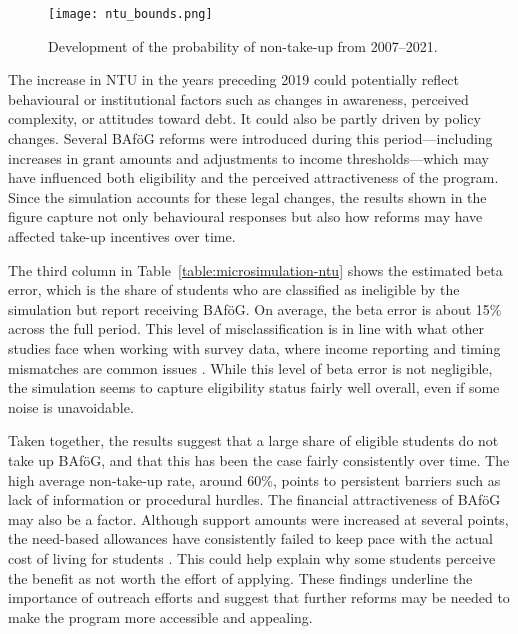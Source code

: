 \begin{figure}[htbp]
  \centering
  \texttt{[image: ntu\_bounds.png]}
  \caption{Development of the probability of non-take-up from 2007--2021.}
  \label{fig:ntu_bounds_over_years}
\end{figure}

The increase in NTU in the years preceding 2019 could potentially reflect behavioural or institutional factors such as changes in awareness, perceived complexity, or attitudes toward debt. 
It could also be partly driven by policy changes. 
Several BAföG reforms were introduced during this period---including increases in grant amounts and adjustments to income thresholds---which may have influenced both eligibility and the perceived attractiveness of the program. 
Since the simulation accounts for these legal changes, the results shown in the figure capture not only behavioural responses but also how reforms may have affected take-up incentives over time.



The third column in Table~\ref{table:microsimulation-ntu} shows the estimated beta error, which is the share of students who are classified as ineligible by the simulation but report receiving BAföG. 
On average, the beta error is about 15\% across the full period. 
This level of misclassification is in line with what other studies face when working with survey data, where income reporting and timing mismatches are common issues \citep{frick_claim_2007}. 
While this level of beta error is not negligible, the simulation seems to capture eligibility status fairly well overall, even if some noise is unavoidable.

Taken together, the results suggest that a large share of eligible students do not take up BAföG, and that this has been the case fairly consistently over time. The high average non-take-up rate, around 60\%, points to persistent barriers such as lack of information or procedural hurdles. The financial attractiveness of BAföG may also be a factor. Although support amounts were increased at several points, the need-based allowances have consistently failed to keep pace with the actual cost of living for students \citep{staack_von_2017}. This could help explain why some students perceive the benefit as not worth the effort of applying. These findings underline the importance of outreach efforts and suggest that further reforms may be needed to make the program more accessible and appealing.



